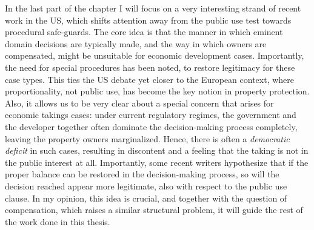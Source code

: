 %


In the last part of the chapter I will focus on a very interesting strand of recent work in the US, which shifts attention away from the public use test towards procedural safe-guards. The core idea is that the manner in which eminent domain decisions are typically made, and the way in which owners are compensated, might be unsuitable for economic development cases. Importantly, the need for special procedures has been noted, to restore legitimacy for these case types. This ties the US debate yet closer to the European context, where proportionality, not public use, has become the key notion in property protection. Also, it allows us to be very clear about a special concern that arises for economic takings cases: under current regulatory regimes, the government and the developer together often dominate the decision-making process completely, leaving the property owners marginalized. Hence, there is often a {\it democratic deficit} in such cases, resulting in discontent and a feeling that the taking is not in the public interest at all. Importantly, some recent writers hypothesize that if the proper balance can be restored in the decision-making process, so will the decision reached appear more legitimate, also with respect to the public use clause. In my opinion, this idea is crucial, and together with the question of compensation, which raises a similar structural problem, it will guide the rest of the work done in this thesis. 

